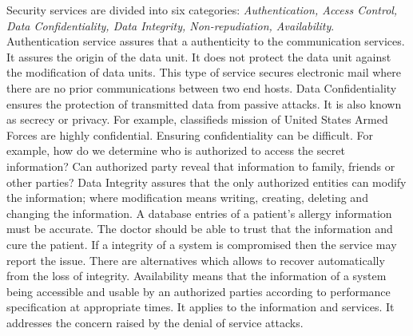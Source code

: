 	Security services are divided into six categories:
	\textit{Authentication, Access Control, Data Confidentiality, Data Integrity, Non-repudiation, Availability}.
	Authentication service assures that a authenticity to the communication services.
	It assures the origin of the data unit. 
	It does not protect the data unit against the modification of data units.
	This type of service secures electronic mail where there are no prior communications between two end hosts.
	Data Confidentiality ensures the protection of transmitted data from passive attacks.
	It is also known as secrecy or privacy.
	For example, classifieds mission of United States Armed Forces are highly confidential.
	Ensuring confidentiality can be difficult.
	For example, how do we determine who is authorized to access the secret information?
	Can authorized party reveal that information to family, friends or other parties?\cite{pfleeger2002security}
	Data Integrity assures that the only authorized entities can modify the information; where modification means writing, creating, deleting and changing the information.
	A database entries of a patient's allergy information must be accurate.
	The doctor should be able to trust that the information and cure the patient.
	If a integrity of a system is compromised then the service may report the issue.
	There are alternatives which allows to recover automatically from the loss of integrity.
	Availability  means that the information of a system being accessible and usable by an authorized parties according to performance specification at appropriate times.
	It applies to the information and services.
	It addresses the concern raised by the denial of service attacks.

